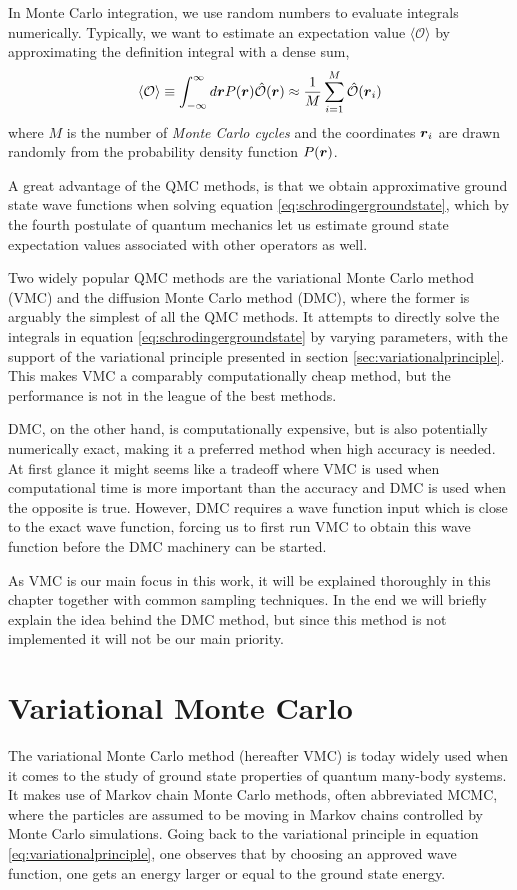 In Monte Carlo integration, we use random numbers to evaluate integrals numerically. Typically, we want to estimate an expectation value $\langle\mathcal{O}\rangle$ by approximating the definition integral with a dense sum,
\begin{equation}
\langle \mathcal{O}\rangle\equiv\int_{-\infty}^{\infty}d\boldsymbol{{r}}P(\boldsymbol{{r}})\hat{\mathcal{O}}(\boldsymbol{{r}})\approx\frac{1}{M}\sum_{i=1}^M\hat{\mathcal{O}}(\boldsymbol{{r}}_i)
\label{eq:montecarlointegration}
\end{equation}
where $M$ is the number of \textit{Monte Carlo cycles} and the coordinates $\boldsymbol{{r}}_i$ are drawn randomly from the probability density function $P(\boldsymbol{{r}})$.

A great advantage of the QMC methods, is that we obtain approximative ground state wave functions when solving equation \eqref{eq:schrodingergroundstate}, which by the fourth postulate of quantum mechanics let us estimate ground state expectation values associated with other operators as well. 

Two widely popular QMC methods are the variational Monte Carlo method (VMC) and the diffusion Monte Carlo method (DMC), where the former is arguably the simplest of all the QMC methods. It attempts to directly solve the integrals in equation \eqref{eq:schrodingergroundstate} by varying parameters, with the support of the variational principle presented in section \ref{sec:variationalprinciple}. This makes VMC a comparably computationally cheap method, but the performance is not in the league of the best methods.

DMC, on the other hand, is computationally expensive, but is also potentially numerically exact, making it a preferred method when high accuracy is needed. At first glance it might seems like a tradeoff where VMC is used when computational time is more important than the accuracy and DMC is used when the opposite is true. However, DMC requires a wave function input which is close to the exact wave function, forcing us to first run VMC to obtain this wave function before the DMC machinery can be started.

As VMC is our main focus in this work, it will be explained thoroughly in this chapter together with common sampling techniques. In the end we will briefly explain the idea behind the DMC method, but since this method is not implemented it will not be our main priority.

\section{Variational Monte Carlo} \label{subsec:vmc}
The variational Monte Carlo method (hereafter VMC) is today widely used when it comes to the study of ground state properties of quantum many-body systems. It makes use of Markov chain Monte Carlo methods, often abbreviated MCMC, where the particles are assumed to be moving in Markov chains controlled by Monte Carlo simulations. Going back to the variational principle in equation \eqref{eq:variationalprinciple}, one observes that by choosing an approved wave function, one gets an energy larger or equal to the ground state energy. \bigskip

